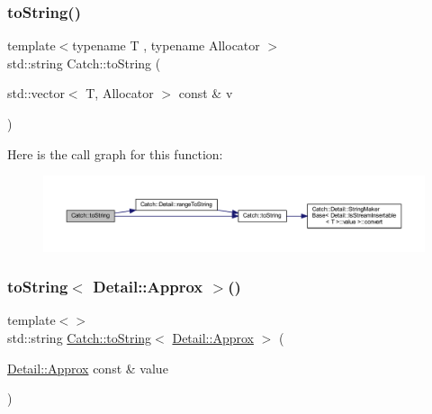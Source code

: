 \hypertarget{namespace_catch_a2899237fef39daaae9a22e7846c0a9bf}{}\label{namespace_catch_a2899237fef39daaae9a22e7846c0a9bf} 
\subsubsection{\texorpdfstring{to\+String()}{toString()}\hspace{0.1cm}{\footnotesize\ttfamily [17/17]}}
{\footnotesize\ttfamily template$<$typename T , typename Allocator $>$ \\
std\+::string Catch\+::to\+String (\begin{DoxyParamCaption}\item[{std\+::vector$<$ T, Allocator $>$ const \&}]{v }\end{DoxyParamCaption})}

Here is the call graph for this function\+:\nopagebreak
\begin{figure}[H]
\begin{center}
\leavevmode
\includegraphics[width=350pt]{namespace_catch_a2899237fef39daaae9a22e7846c0a9bf_cgraph}
\end{center}
\end{figure}
\hypertarget{namespace_catch_ac501c2b6bfe82978d699ddda37c53d13}{}\label{namespace_catch_ac501c2b6bfe82978d699ddda37c53d13} 
\subsubsection{\texorpdfstring{to\+String$<$ Detail\+::\+Approx $>$()}{toString< Detail::Approx >()}}
{\footnotesize\ttfamily template$<$$>$ \\
std\+::string \hyperlink{namespace_catch_adbd1730f961da94d9ed284f70fd7a28b}{Catch\+::to\+String}$<$ \hyperlink{class_catch_1_1_detail_1_1_approx}{Detail\+::\+Approx} $>$ (\begin{DoxyParamCaption}\item[{\hyperlink{class_catch_1_1_detail_1_1_approx}{Detail\+::\+Approx} const \&}]{value }\end{DoxyParamCaption})\hspace{0.3cm}{\ttfamily [inline]}}

